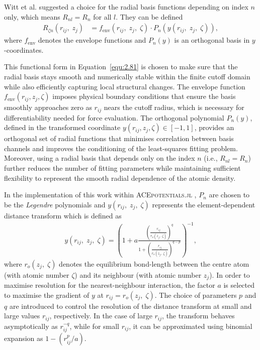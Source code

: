 Witt et al. \cite{Witt2023} suggested a choice for the radial basis functions depending on index $n$ only, which means $R_{nl}=R_{n}$ for all $l$.   
They can be defined 
\begin{equation} \label{equ:2.81}
\begin{split}
R_{\zeta n}(r_{ij},\;z_{j})
&= f_{\text{env}}(r_{ij},\;z_{j},\;\zeta)\cdot
P_{n}(y(r_{ij},\;z_{j},\;\zeta)),
\end{split}
\end{equation}
where $f_{\text{env}}$ denotes the envelope functions and $P_{n}(y)$ is an orthogonal basis in $y$-coordinates.

This functional form in Equation~\eqref{equ:2.81} is chosen to make sure that the radial basis stays smooth and numerically stable within the finite cutoff domain while also efficiently capturing local structural changes. 
The envelope function \( f_{\text{env}}(r_{ij}, z_{j}, \zeta) \) imposes physical boundary conditions that ensure the basis smoothly approaches zero as \( r_{ij} \) nears the cutoff radius, which is necessary for differentiability needed for force evaluation. 
The orthogonal polynomial \( P_{n}(y) \), defined in the transformed coordinate \( y(r_{ij}, z_{j}, \zeta) \in [-1, 1] \), provides an orthogonal set of radial functions that minimises correlation between basis channels and improves the conditioning of the least-squares fitting problem. 
Moreover, using a radial basis that depends only on the index \( n \) (i.e., \(R_{nl} = R_n\)) further reduces the number of fitting parameters while maintaining sufficient flexibility to represent the smooth radial dependence of the atomic density. 

In the implementation of this work within \textsc{ACEpotentials.jl} \cite{Witt2023}, $P_{n}$ are chosen to be the \textit{Legendre} polynomials and $y(r_{ij},\;z_{j},\;\zeta)$ represents the element-dependent distance transform which is defined as
\begin{equation} \label{equ:2.82}
\begin{split}
y(r_{ij},\;z_{j},\;\zeta) =
\left(
1+a
\frac{\left(
    \frac{r_{ij}}{r_{o}(z_{j},\;\zeta)}
    \right)^{q}}
{1+\left(
    \frac{r_{ij}}{r_{o}(z_{j},\;\zeta)}
    \right)^{q-p}}
\right)^{-1},
\end{split}
\end{equation}
where $r_{o}(z_{j},\;\zeta)$ denotes the equilibrium bond-length between the centre atom (with atomic number $\zeta$) and its neighbour (with atomic number $z_{j}$).
In order to maximise resolution for the nearest-neighbour interaction, the factor $a$ is selected to maximise the gradient of $y$ at $r_{ij}=r_{o}(z_{j},\;\zeta)$.
The choice of parameters $p$ and $q$ are introduced to control the resolution of the distance transform at small and large values $r_{ij}$, respectively.
In the case of large $r_{ij}$, the transform behaves asymptotically as $r_{ij}^{-q}$, while for small $r_{ij}$, it can be approximated using binomial expansion as $1-(r_{ij}^{p}/a)$.


